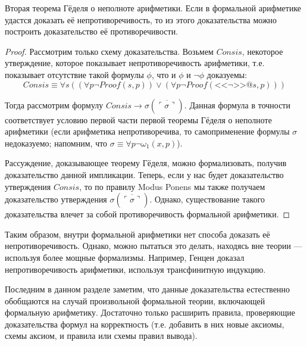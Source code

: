 \begin{theorem}{Вторая теорема Гёделя о неполноте арифметики.}
Если в формальной арифметике удастся доказать её непротиворечивость, то
из этого доказательства можно построить доказательство её противоречивости.
\end{theorem}

\begin{proof}
Рассмотрим только схему доказательства. Возьмем $Consis$, некоторое 
утверждение, которое показывает непротиворечивость арифметики, т.е. 
показывает отсутствие такой формулы $\phi$, что и $\phi$ и $\neg \phi$ доказуемы:
$$Consis \equiv \forall s ((\forall p \neg Proof (s,p)) \vee (\forall p \neg Proof (\texttt{<<}\neg\texttt{>>} @ s, p)))$$

Тогда рассмотрим формулу $Consis \rightarrow \sigma (\overline{\ulcorner\sigma\urcorner})$.
Данная формула в точности соответствует условию первой части первой теоремы Гёделя 
о неполноте арифметики (если арифметика непротиворечива, то самоприменение формулы $\sigma$ недоказуемо;
напомним, что $\sigma \equiv \forall p \neg \omega_1 (x,p)$).

Рассуждение, доказывающее теорему Гёделя, можно формализовать, получив доказательство
данной импликации. Теперь, если у нас будет доказательство утверждения $Consis$,
то по правилу Modus Ponens мы также получаем доказательство утверждения $\sigma (\overline{\ulcorner\sigma\urcorner})$. 
Однако, существование такого доказательства влечет за собой противоречивость формальной арифметики.
\end{proof}

Таким образом, внутри формальной арифметики нет способа доказать её непротиворечивость.
Однако, можно пытаться это делать, находясь вне теории --- используя более 
мощные формализмы. Например, Генцен доказал непротиворечивость арифметики, 
используя трансфинитную индукцию.

Последним в данном разделе заметим, что данные доказательства естественно
обобщаются на случай произвольной формальной теории, включающей формальную
арифметику. Достаточно только расширить правила, проверяющие доказательства
формул на корректность (т.е. добавить в них новые аксиомы, схемы аксиом,
и правила или схемы правил вывода).
